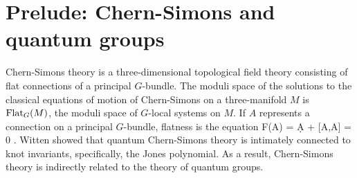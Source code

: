 \documentclass[10pt]{amsart}
\begin{document}
%
%
%
%
%


\section{Prelude: Chern-Simons and quantum groups}

Chern-Simons theory is a three-dimensional topological field theory consisting of flat connections of a principal $G$-bundle. 
The moduli space of the solutions to the classical equations of motion of Chern-Simons on a three-manifold $M$ is ${\rm Flat}_G(M)$, the moduli space of $G$-local systems on $M$. 
If $A$ represents a connection on a principal $G$-bundle, flatness is the equation
\ben 
F(A) = \d A +  [A,A] = 0 .
\een 
Witten \cite{WittenJones} showed that quantum Chern-Simons theory is intimately connected to knot invariants, specifically, the Jones polynomial. 
As a result, Chern-Simons theory is indirectly related to the theory of quantum groups. 
\end{document}
